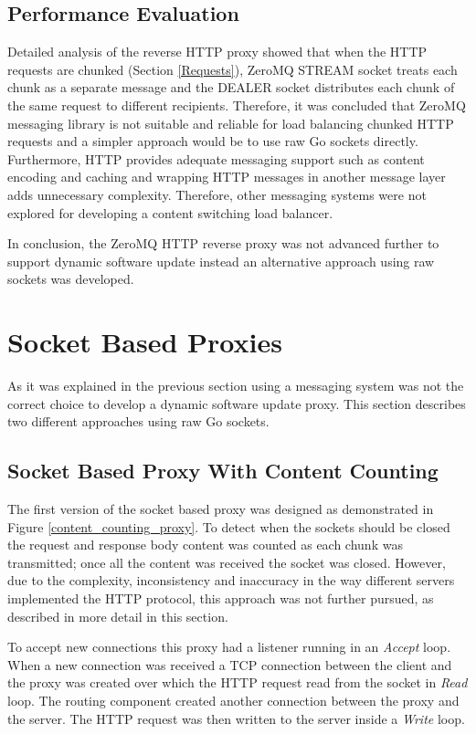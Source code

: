 \documentclass[a4paper,11pt,twoside]{report}
\begin{document}
\subsection{Performance Evaluation}
Detailed analysis of the reverse HTTP proxy showed that when the HTTP requests are chunked (Section \ref{Requests}), ZeroMQ STREAM socket treats each chunk as a separate message and the DEALER socket distributes each chunk of the same request to different recipients. Therefore, it was concluded that ZeroMQ messaging library is not suitable and reliable for load balancing chunked HTTP requests and a simpler approach would be to use raw Go sockets directly. Furthermore, HTTP provides adequate messaging support such as content encoding and caching and wrapping HTTP messages in another message layer adds unnecessary complexity. Therefore, other messaging systems were not explored for developing a content switching load balancer. 

In conclusion, the ZeroMQ HTTP reverse proxy was not advanced further to support dynamic software update instead an alternative approach using raw sockets was developed. 

\section{Socket Based Proxies}
As it was explained in the previous section using a messaging system was not the correct choice to develop a dynamic software update proxy. This section describes two different approaches using raw Go sockets.   

\subsection{Socket Based Proxy With Content Counting}\label{Content-Counting}
The first version of the socket based proxy was designed as demonstrated in Figure \ref{content_counting_proxy}. To detect when the sockets should be closed the request and response body content was counted as each chunk was transmitted; once all the content was received the socket was closed.  However, due to the complexity, inconsistency and inaccuracy in the way different servers implemented the HTTP protocol, this approach was not further pursued, as described in more detail in this section.

To accept new connections this proxy had a listener running in an  \textit{Accept} loop.  When a new connection was received a TCP connection between the client and the proxy was created over which the HTTP request read from the socket in \textit{Read} loop.  The routing component created another connection between the proxy and the server.  The HTTP request was then written to the server inside a \textit{Write} loop.
\end{document}
